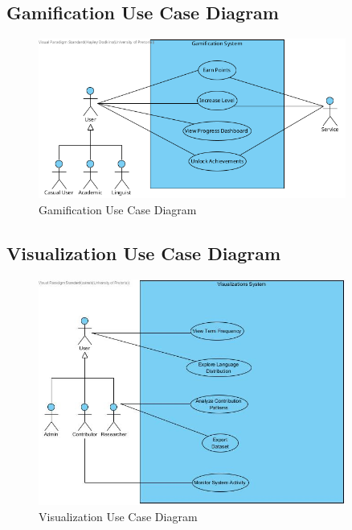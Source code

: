 \documentclass[12pt]{article}
\begin{document}
\subsection{Gamification Use Case Diagram}
\begin{figure}[H]
  \centering
  \includegraphics[width=0.9\textwidth]{GamifictionUseCase.png}
  \caption{Gamification Use Case Diagram}
  \label{fig:gamification-use-case}
\end{figure}

\subsection{Visualization Use Case Diagram}
\begin{figure}[H]
  \centering
  \includegraphics[width=0.9\textwidth]{Visualizations.jpg}
  \caption{Visualization Use Case Diagram}
  \label{fig:visualization-use-case}
\end{figure}
\end{document}
